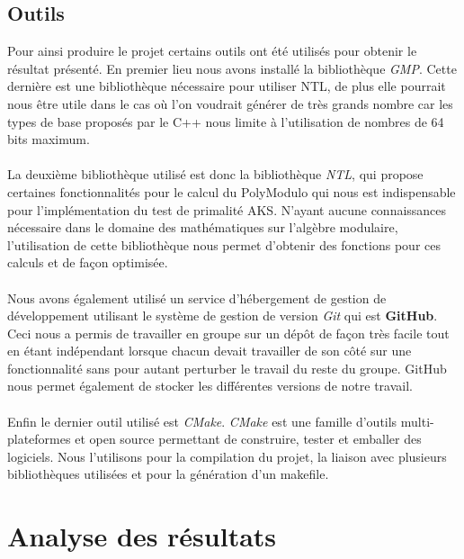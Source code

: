 		\subsection{Outils}
		Pour ainsi produire le projet certains outils ont été utilisés pour obtenir le résultat présenté. En premier lieu nous avons installé la bibliothèque \textit{GMP}\cite{gmp}. Cette dernière est une bibliothèque nécessaire pour utiliser NTL, de plus elle pourrait nous être utile dans le cas où l'on voudrait générer de très grands nombre car les types de base proposés par le C++ nous limite à l'utilisation de nombres de 64 bits maximum.
		\paragraph{}La deuxième bibliothèque utilisé est donc la bibliothèque \textit{NTL}\cite{ntl}, qui propose certaines fonctionnalités pour le calcul du PolyModulo\cite{AKS2} qui nous est indispensable pour l'implémentation du test de primalité AKS. N'ayant aucune connaissances nécessaire dans le domaine des mathématiques sur l'algèbre modulaire, l'utilisation de cette bibliothèque nous permet d'obtenir des fonctions pour ces calculs et de façon optimisée.  
		\paragraph{}Nous avons également utilisé un service d’hébergement de gestion de développement utilisant le système de gestion de version \textit{Git} qui est \textbf{GitHub}. Ceci nous a permis de travailler en groupe sur un dépôt de façon très facile tout en étant indépendant lorsque chacun devait travailler de son côté sur une fonctionnalité sans pour autant perturber le travail du reste du groupe. GitHub nous permet également de stocker les différentes versions de notre travail.   
		\paragraph{}Enfin le dernier outil utilisé est \textit{CMake}\cite{cmake}. \textit{CMake} est une famille d'outils multi-plateformes et open source permettant de construire, tester et emballer des logiciels. Nous l'utilisons pour la compilation du projet, la liaison avec plusieurs bibliothèques utilisées et pour la génération d'un makefile. 
			
	\section{Analyse des résultats}
